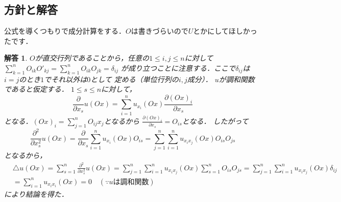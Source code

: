\documentclass[dvipdfmx,autodetect-engine]{jsarticle}
\newtheorem*{ans}{解答}
\theoremstyle{remark}
\theoremstyle{definition}
\begin{document}
\subsection{方針と解答}
公式を導くつもりで成分計算をする．$O$は書きづらいので$U$とかにしてほしかったです．
\begin{ans}
    $O$が直交行列であることから，任意の$1\leq i,j \leq n$に対して
    $\sum_{k=1}^{n} O_{ik} O'_{kj} = \sum_{k=1}^{n} O_{ik} O_{jk} = \delta_{ij}$
    が成り立つことに注意する．ここで$\delta_{ij}$は$i=j$のとき$1$でそれ以外は$0$として
    定める（単位行列の$i,j$成分）．
    $u$が調和関数であると仮定する．
    $1\leq s\leq n$に対して，
    \begin{equation}
        \frac{\partial}{\partial x_{s}} u(Ox)
        = \sum_{i=1}^{n} u_{x_{i}}(Ox) \frac{\partial (Ox)_{i}}{\partial x_{s}}
    \end{equation}
    となる．$(Ox)_{i} = \sum_{j=1}^{n} O_{ij}x_{j}$となるから
    $\frac{\partial (Ox)_{i}}{\partial x_{s}} = O_{is}$となる．
    したがって
    \begin{equation}
        \frac{\partial^{2}}{\partial x_{s}^{2}} u(Ox)
        = \frac{\partial}{\partial x_{s}}
        \sum_{i=1}^{n} u_{x_{i}}(Ox) O_{is} 
        = \sum_{j=1}^{n} \sum_{i=1}^{n} u_{x_{i}x_{j}}(Ox) O_{is} O_{js}
    \end{equation}
    となるから，
    \begin{align}
        &\triangle u(Ox) = \sum_{s=1}^{n}  \frac{\partial^{2}}{\partial x_{s}^{2}} u(Ox)
        = \sum_{j=1}^{n} \sum_{i=1}^{n} u_{x_{i}x_{j}}(Ox) \sum_{s=1}^{n}O_{is} O_{js}
        = \sum_{j=1}^{n} \sum_{i=1}^{n} u_{x_{i}x_{j}}(Ox) \delta_{ij} \\
        &= \sum_{i=1}^{n} u_{x_{i}x_{i}}(Ox) = 0\quad(\because u\text{は調和関数})
    \end{align}
    により結論を得た．
\end{ans}
\end{document}
